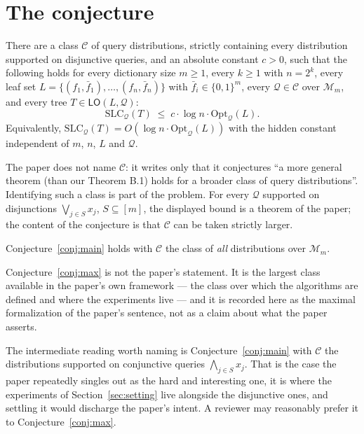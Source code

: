\documentclass{conjura-conjecture}
\newcommand{\bits}{\{0,1\}}
\newcommand{\Qd}{\mathcal{Q}}
\newcommand{\Mon}{\mathcal{M}}
\newcommand{\SLC}{\mathrm{SLC}}
\newcommand{\Opt}{\mathrm{Opt}}
\newcommand{\LO}{\mathsf{LO}}
\begin{document}
\section{The conjecture}\label{sec:conjectures}

\begin{conjecture}\label{conj:main}
There are a class $\mathcal{C}$ of query distributions, strictly containing
every distribution supported on disjunctive queries, and an absolute
constant $c > 0$, such that the following holds for every dictionary size
$m \ge 1$, every $k \ge 1$ with $n = 2^{k}$, every leaf set
$L = \{(f_1,\bar f_1),\dots,(f_n,\bar f_n)\}$ with
$\bar f_i \in \bits^{m}$, every $\Qd \in \mathcal{C}$ over $\Mon_m$, and
every tree $T \in \LO(L,\Qd)$:
\[
  \SLC_{\Qd}(T) \;\le\; c \cdot \log n \cdot \Opt_{\Qd}(L).
\]
Equivalently, $\SLC_{\Qd}(T) = O(\log n \cdot \Opt_{\Qd}(L))$ with the
hidden constant independent of $m$, $n$, $L$ and $\Qd$.
\end{conjecture}

The paper does not name $\mathcal{C}$: it writes only that it conjectures
``a more general theorem (than our Theorem B.1) holds for a broader class
of query distributions''. Identifying such a class is part of the problem.
For every $\Qd$ supported on disjunctions $\bigvee_{j \in S} x_j$,
$S \subseteq [m]$, the displayed bound is a theorem of the paper; the
content of the conjecture is that $\mathcal{C}$ can be taken strictly
larger.

\begin{conjecture}\label{conj:max}
Conjecture~\ref{conj:main} holds with $\mathcal{C}$ the class of
\emph{all} distributions over $\Mon_m$.
\end{conjecture}

Conjecture~\ref{conj:max} is not the paper's statement. It is the largest
class available in the paper's own framework --- the class over which the
algorithms are defined and where the experiments live --- and it is
recorded here as the maximal formalization of the paper's sentence, not as
a claim about what the paper asserts.

\begin{remark}\label{rem:conj}
The intermediate reading worth naming is Conjecture~\ref{conj:main} with
$\mathcal{C}$ the distributions supported on conjunctive queries
$\bigwedge_{j \in S} x_j$. That is the case the paper repeatedly singles
out as the hard and interesting one, it is where the experiments of
Section~\ref{sec:setting} live alongside the disjunctive ones, and settling
it would discharge the paper's intent. A reviewer may reasonably prefer it
to Conjecture~\ref{conj:max}.
\end{remark}
\end{document}
